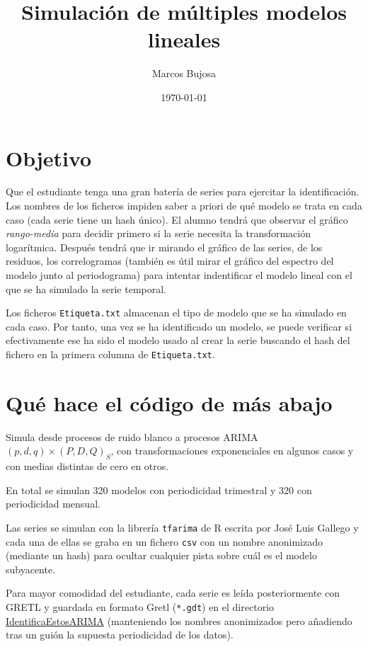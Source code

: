 \documentclass[11pt]{article}
\author{Marcos Bujosa}
\date{\today}
\title{Simulación de múltiples modelos lineales}
\begin{document}
\maketitle
\section{Objetivo}
\label{sec:orgcef27e7}

Que el estudiante tenga una gran batería de series para ejercitar la
identificación. Los nombres de los ficheros impiden saber a priori de
qué modelo se trata en cada caso (cada serie tiene un hash único). El
alumno tendrá que observar el gráfico \emph{rango-media} para decidir
primero si la serie necesita la transformación logarítmica. Después
tendrá que ir mirando el gráfico de las series, de los residuos, los
correlogramas (también es útil mirar el gráfico del espectro del
modelo junto al periodograma) para intentar indentificar el modelo
lineal con el que se ha simulado la serie temporal.

Los ficheros \texttt{Etiqueta.txt} almacenan el tipo de modelo que se ha
simulado en cada caso. Por tanto, una vez se ha identificado un
modelo, se puede verificar si efectivamente ese ha sido el modelo
usado al crear la serie buscando el hash del fichero en la primera
columna de \texttt{Etiqueta.txt}.
\section{Qué hace el código de más abajo}
\label{sec:org42f97c3}

Simula desde procesos de ruido blanco a procesos
ARIMA\((p,d,q)\times(P,D,Q)_S\), con transformaciones exponenciales en
algunos casos y con medias distintas de cero en otros.

En total se simulan 320 modelos con periodicidad trimestral y 320 con
periodicidad mensual.

Las series se simulan con la librería \texttt{tfarima} de R escrita por José
Luis Gallego y cada una de ellas se graba en un fichero \texttt{csv} con un
nombre anonimizado (mediante un hash) para ocultar cualquier pista
sobre cuál es el modelo subyacente.

Para mayor comodidad del estudiante, cada serie es leída
posteriormente con GRETL y guardada en formato Gretl (\texttt{*.gdt}) en el
directorio \href{IdentificaEstosARIMA/}{IdentificaEstosARIMA} (manteniendo los nombres anonimizados
pero añadiendo tras un guión la supuesta periodicidad de los datos).
\end{document}
